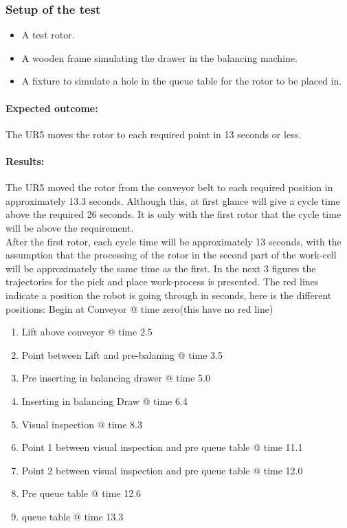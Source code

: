 \subsubsection{Setup of the test}

\begin{itemize}
   \item A test rotor.
   \item A wooden frame simulating the drawer in the balancing machine.
   \item A fixture to simulate a hole in the queue table for the rotor to be placed in.
   
\end{itemize}

\paragraph{Expected outcome:}
The UR5 moves the rotor to each required point in 13 seconds or less. 

\paragraph{Results:}
The UR5 moved the rotor from the conveyor belt to each required position in approximately 13.3 seconds. Although this, at first glance will give a cycle time above the required 26 seconds. It is only with the first rotor that the cycle time will be above the requirement.\\
After the first rotor, each cycle time will be approximately 13 seconds, with the assumption that the processing of the rotor in the second part of the work-cell will be approximately the same time as the first. In the next 3 figures the trajectories for the pick and place work-process is presented. The red lines indicate a position the robot is going through in seconds, here is the different positions: Begin at Conveyor @ time zero(this have no red line)
\begin{enumerate}
    \item Lift above conveyor @ time 2.5
    \item Point between Lift and pre-balaning @ time 3.5
    \item Pre inserting in balancing drawer @ time 5.0
    \item Inserting in balancing Draw @ time 6.4
    \item Visual inspection @ time 8.3
    \item Point 1 between visual inspection and pre queue table @ time 11.1
    \item Point 2 between visual inspection and pre queue table @ time 12.0
    \item Pre queue table @ time 12.6
    \item queue table @ time 13.3
\end{enumerate}

